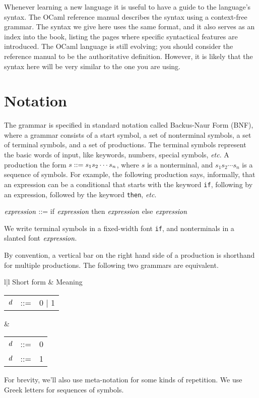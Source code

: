 %
%
%

Whenever learning a new language it is useful to have a guide to the language's syntax.  The OCaml
reference manual describes the syntax using a context-free grammar.  The syntax we give here uses
the same format, and it also serves as an index into the book, listing the pages where specific
syntactical features are introduced.  The OCaml language is still evolving; you should consider the
reference manual to be the authoritative definition.  However, it is likely that the syntax here will
be very similar to the one you are using.

\section{Notation}

The grammar is specified in standard notation called Backus-Naur Form (BNF), where a grammar
consists of a start symbol, a set of nonterminal symbols, a set of terminal symbols, and a set of
productions.  The terminal symbols represent the basic words of input, like keywords, numbers,
special symbols, \emph{etc}.  A production the form $s \mathrel{\hbox{::=}} s_1 s_2 \cdots s_n$,
where $s$ is a nonterminal, and $s_1 s_2 \cdots s_n$ is a sequence of symbols.  For example, the
following production says, informally, that an expression can be a conditional that starts with the
keyword \hbox{\lstinline/if/}, following by an expression, followed by the keyword \hbox{\lstinline/then/},
\emph{etc}.

\begin{ocaml}
$\textit{\rmfamily expression}$ ::= if $\textit{\rmfamily expression}$ then $\textit{\rmfamily expression}$ else $\textit{\rmfamily expression}$
\end{ocaml}
%
We write terminal symbols in a fixed-width font \hbox{\lstinline/if/}, and nonterminals in a slanted font
$\textit{\rmfamily expression}$.

By convention, a vertical bar on the right hand side of a production is shorthand for multiple
productions.  The following two grammars are equivalent.

\begin{center}
\begin{tabular}{l|l}
Short form & Meaning\\
\hline
\begin{tabular}[t]{rcl}
$\textit{\rmfamily d}$ & ::= & 0 | 1
\end{tabular}
&
\begin{tabular}[t]{rcl}
$\textit{\rmfamily d}$ & ::= & 0\\
$\textit{\rmfamily d}$ & ::= & 1
\end{tabular}
\end{tabular}
\end{center}
%
For brevity, we'll also use meta-notation for some kinds of repetition.  We use Greek letters for
sequences of symbols.

